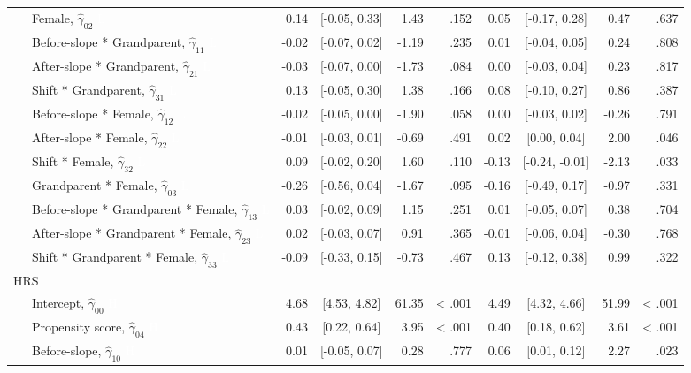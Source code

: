 \documentclass[
  english,
  man,floatsintext]{apa7}
\newenvironment{lltable}{\begin{landscape}\begin{center}\begin{ThreePartTable}}{\end{ThreePartTable}\end{center}\end{landscape}}
\begin{document}
\begin{lltable}
{\begin{longtable}{lrcrrrcrr}
\ \ \ Female, $\hat{\gamma}_{02}$ \textcolor{white}{L} & 0.14 & {}[-0.05, 0.33] & 1.43 & .152 & 0.05 & {}[-0.17, 0.28] & 0.47 & .637\\
\ \ \ Before-slope * Grandparent, $\hat{\gamma}_{11}$ \textcolor{white}{L} & -0.02 & {}[-0.07, 0.02] & -1.19 & .235 & 0.01 & {}[-0.04, 0.05] & 0.24 & .808\\
\ \ \ After-slope * Grandparent, $\hat{\gamma}_{21}$ \textcolor{white}{L} & -0.03 & {}[-0.07, 0.00] & -1.73 & .084 & 0.00 & {}[-0.03, 0.04] & 0.23 & .817\\
\ \ \ Shift * Grandparent, $\hat{\gamma}_{31}$ \textcolor{white}{L} & 0.13 & {}[-0.05, 0.30] & 1.38 & .166 & 0.08 & {}[-0.10, 0.27] & 0.86 & .387\\
\ \ \ Before-slope * Female, $\hat{\gamma}_{12}$ \textcolor{white}{L} & -0.02 & {}[-0.05, 0.00] & -1.90 & .058 & 0.00 & {}[-0.03, 0.02] & -0.26 & .791\\
\ \ \ After-slope * Female, $\hat{\gamma}_{22}$ \textcolor{white}{L} & -0.01 & {}[-0.03, 0.01] & -0.69 & .491 & 0.02 & {}[0.00, 0.04] & 2.00 & .046\\
\ \ \ Shift * Female, $\hat{\gamma}_{32}$ \textcolor{white}{L} & 0.09 & {}[-0.02, 0.20] & 1.60 & .110 & -0.13 & {}[-0.24, -0.01] & -2.13 & .033\\
\ \ \ Grandparent * Female, $\hat{\gamma}_{03}$ \textcolor{white}{L} & -0.26 & {}[-0.56, 0.04] & -1.67 & .095 & -0.16 & {}[-0.49, 0.17] & -0.97 & .331\\
\ \ \ Before-slope * Grandparent * Female, $\hat{\gamma}_{13}$ \textcolor{white}{L} & 0.03 & {}[-0.02, 0.09] & 1.15 & .251 & 0.01 & {}[-0.05, 0.07] & 0.38 & .704\\
\ \ \ After-slope * Grandparent * Female, $\hat{\gamma}_{23}$ \textcolor{white}{L} & 0.02 & {}[-0.03, 0.07] & 0.91 & .365 & -0.01 & {}[-0.06, 0.04] & -0.30 & .768\\
\ \ \ Shift * Grandparent * Female, $\hat{\gamma}_{33}$ \textcolor{white}{L} & -0.09 & {}[-0.33, 0.15] & -0.73 & .467 & 0.13 & {}[-0.12, 0.38] & 0.99 & .322\\
HRS &  &  &  &  &  &  &  & \\
\ \ \ Intercept, $\hat{\gamma}_{00}$ \textcolor{white}{H} & 4.68 & {}[4.53, 4.82] & 61.35 & < .001 & 4.49 & {}[4.32, 4.66] & 51.99 & < .001\\
\ \ \ Propensity score, $\hat{\gamma}_{04}$ \textcolor{white}{H} & 0.43 & {}[0.22, 0.64] & 3.95 & < .001 & 0.40 & {}[0.18, 0.62] & 3.61 & < .001\\
\ \ \ Before-slope, $\hat{\gamma}_{10}$ \textcolor{white}{H} & 0.01 & {}[-0.05, 0.07] & 0.28 & .777 & 0.06 & {}[0.01, 0.12] & 2.27 & .023\\

\end{longtable}}
\end{lltable}
\end{document}
